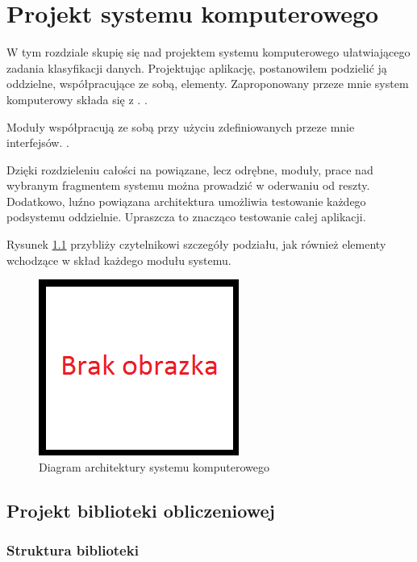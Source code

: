 \documentclass[../thesis.tex]{subfiles}
\begin{document}
\pagestyle{plain}

\chapter{Projekt systemu komputerowego}

W tym rozdziale skupię się nad projektem systemu komputerowego ułatwiającego zadania klasyfikacji danych. Projektując aplikację, postanowiłem podzielić ją oddzielne, współpracujące ze sobą, elementy. Zaproponowany przeze mnie system komputerowy składa się z . . 

Moduły współpracują ze sobą przy użyciu zdefiniowanych przeze mnie interfejsów. .

Dzięki rozdzieleniu całości na powiązane, lecz odrębne, moduły, prace nad wybranym fragmentem systemu można prowadzić w oderwaniu od reszty. Dodatkowo, luźno powiązana architektura umożliwia testowanie każdego podsystemu oddzielnie. Upraszcza to znacząco testowanie całej aplikacji.

Rysunek \ref{proj:arch_diagram} przybliży czytelnikowi szczegóły podziału, jak również elementy wchodzące w skład każdego modułu systemu.

\begin{figure}[h]
\centering
\includegraphics{missing.png}
\caption{Diagram architektury systemu komputerowego}
\label{proj:arch_diagram}
\end{figure}

\section{Projekt biblioteki obliczeniowej}

\subsection{Struktura biblioteki}
\label{proj:sec_structure}
\end{document}
